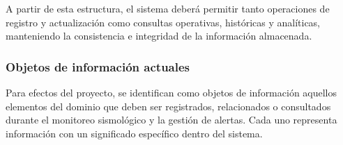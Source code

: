 \documentclass[12pt,a4paper]{article}
\begin{document}
A partir de esta estructura, el sistema deberá permitir tanto operaciones de registro y actualización como consultas operativas, históricas y analíticas, manteniendo la consistencia e integridad de la información almacenada.


\subsubsection{Objetos de información actuales}

Para efectos del proyecto, se identifican como objetos de información aquellos elementos del dominio que deben ser registrados, relacionados o consultados durante el monitoreo sismológico y la gestión de alertas. Cada uno representa información con un significado específico dentro del sistema.
\end{document}
